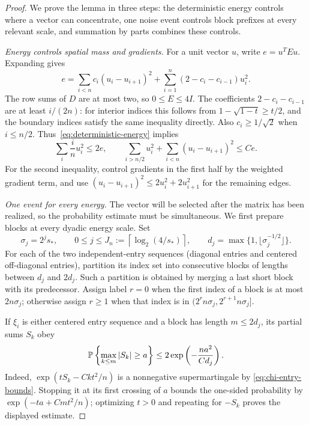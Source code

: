 \begin{proof}
We prove the lemma in three steps: the deterministic energy controls
where a vector can concentrate, one noise event controls block prefixes
at every relevant scale, and summation by parts combines these controls.

\smallskip\noindent\emph{Energy controls spatial mass and gradients.}
For a unit vector $u$, write $e=u^TEu$. Expanding gives
\begin{equation}
 e=\sum_{i<n}c_i(u_i-u_{i+1})^2
   +\sum_{i=1}^n(2-c_i-c_{i-1})u_i^2.
 \label{eq:deterministic-energy}
\end{equation}
The row sums of $D$ are at most two, so $0\le E\le4I$.  The coefficients
$2-c_i-c_{i-1}$ are at least $i/(2n)$: for interior indices this follows
from $1-\sqrt{1-t}\ge t/2$, and the boundary indices satisfy the same
inequality directly.  Also $c_i\ge1/\sqrt2$ when $i\le n/2$.
Thus~\eqref{eq:deterministic-energy} implies
\begin{equation}
 \sum_i\frac{i}{n}u_i^2\le2e,\qquad
 \sum_{i>n/2}u_i^2+
 \sum_{i<n}(u_i-u_{i+1})^2\le Ce.
 \label{eq:energy-tail-gradient}
\end{equation}
For the second inequality, control gradients in the first half by the
weighted gradient term, and use
$(u_i-u_{i+1})^2\le2u_i^2+2u_{i+1}^2$ for the remaining edges.

\smallskip\noindent\emph{One event for every energy.}
The vector will be selected after the matrix has been realized, so the
probability estimate must be simultaneous. We first prepare blocks at
every dyadic energy scale. Set
\[
 \sigma_j=2^js_*,\qquad
 0\le j\le J_n:=\left\lceil\log_2(4/s_*)\right\rceil,
 \qquad d_j=\max\{1,\lfloor\sigma_j^{-1/2}\rfloor\}.
\]
For each of the two independent-entry sequences (diagonal entries and
centered off-diagonal entries), partition its index set into consecutive
blocks of lengths between $d_j$ and $2d_j$.  Such a partition is obtained
by merging a last short block with its predecessor.  Assign label $r=0$
when the first index of a block is at most $2n\sigma_j$; otherwise assign
$r\ge1$ when that index is in
$(2^rn\sigma_j,2^{r+1}n\sigma_j]$.

If $\xi_i$ is either centered entry sequence and a block has length
$m\le2d_j$, its partial sums $S_k$ obey
\[
 \mathbb P\left\{\max_{k\le m}|S_k|\ge a\right\}
 \le2\exp\left(-\frac{na^2}{C d_j}\right).
\]
Indeed, $\exp(tS_k-Ckt^2/n)$ is a nonnegative supermartingale by
\eqref{eq:chi-entry-bounds}.  Stopping it at its first crossing of $a$
bounds the one-sided probability by
$\exp(-ta+Cmt^2/n)$; optimizing $t>0$ and repeating for $-S_k$ proves
the displayed estimate.


\end{proof}
